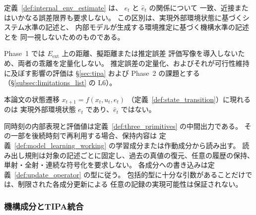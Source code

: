 \begin{remark}[実現外部環境状態と内部環境推定の乖離]
\label{rem:estimate_gap}

定義~\ref{def:internal_env_estimate} は、
$e_t$ と $\hat{e}_t$ の関係について
一致、近接またはいかなる誤差限界も要求しない。
この区別は、実現外部環境状態に基づくシステム水準の記述と、
内部モデルが生成する環境推定に基づく機構水準の記述とを
同一視しないためのものである。

Phase~1 では $E_{\mathrm{ext}}$ 上の距離、擬距離または推定誤差
評価写像を導入しないため、両者の乖離を定量化しない。
推定誤差の定量化、およびそれが可行性維持に及ぼす影響の評価は
\S\ref{sec:tipa} および Phase~2 の課題とする（\S\ref{subsec:limitations_list} の L6）。

本論文の状態遷移
$x_{t+1}=f(x_t,u_t,e_t)$
（定義~\ref{def:state_transition}）に現れるのは
実現外部環境状態 $e_t$ であり、$\hat{e}_t$ ではない。
\end{remark}

\begin{remark}[内部モデル状態と内部表現の保持]
\label{rem:M_encodes_representation}
同時刻の内部表現と評価値は定義~\ref{def:three_primitives} の中間出力である。
その一部を後続時刻で再利用する場合、保持内容は
定義~\ref{def:model_learning_working} の学習成分または作動成分から読み出す。
読み出し規則は対象の記述ごとに固定し、過去の真値の復元、任意の履歴の保持、
単射・全射・連続な符号化を要求しない。
各成分への書き込みは定義~\ref{def:update_operator} の型に従う。
包括的型に十分な引数があることだけでは、制限された各成分更新による
任意の記録の実現可能性は保証されない。
\end{remark}

\subsubsection{機構成分とTIPA統合}


